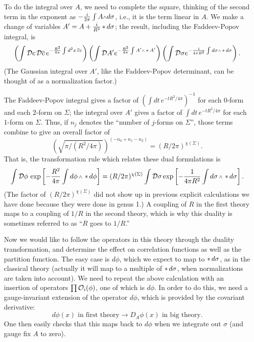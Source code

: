 To do the integral over $A$, we need to complete the square, thinking of
the second
term in the exponent as
$-\frac{i}{2\pi}\int A\wdg d\sigma$,
i.e., it is the term linear in $A$.  We make a change of variables
$A'=A+\frac{i}{R^2}\mathop{*} d\sigma$;
the result, including the Faddeev-Popov integral, is
\begin{equation}
\left(
\int\cD c\,\cD\overline{c}\,e^{-\frac{R^2}{4\pi}\int d^2x\,
\overline{c}c }\right)
\left(
\int \cD A' e^{-\frac{R^2}{4\pi}\int A'\wdg\hstar A'}\right)
\left(
\int \cD \sigma e^{-\frac1{4\pi R^2}\int
d\sigma\wdg\hstar d\sigma}\right).
\end{equation}
(The Gaussian integral over $A'$, like the Faddeev-Popov determinant, can
be thought of as a
normalization factor.)

The Faddeev-Popov integral gives a factor of $(\int dt\,e^{-tR^2/4\pi})^{-1}$
for
each $0$-form and
each $2$-form on $\Sigma$; the integral over $A'$ gives a factor of $\int
dt\,e^{-tR^2/4\pi}$
for each $1$-form on $\Sigma$.  Thus, if $n_j$ denotes the ``number of
$j$-forms
on $\Sigma$'', those terms combine to give an overall factor of
\begin{equation}
(\sqrt{\pi/(R^2/4\pi)})^{(-n_0+n_1-n_2)} = (R/2\pi)^{\chi(\Sigma)}.
\end{equation}
That is, the transformation rule which relates these dual formulations is
\begin{equation}
\int \cD\phi\,\exp\left[-\frac{R^2}{4\pi}\int d\phi\wdg\hstar d\phi\right]
= (R/2\pi)^{\chi(\Sigma)}
\int \cD\sigma \exp\left[-\frac1{4\pi R^2}\int d\sigma\wdg\hstar
d\sigma\right].
\end{equation}
(The factor of $(R/2\pi)^{\chi(\Sigma)}$ did not show up in previous explicit
calculations
we have done because they were done in genus 1.)  A coupling of $R$ in the
first
theory maps to a coupling of $1/R$ in the second theory, which is why this
duality
is sometimes referred to as ``$R$ goes to $1/R$.''

Now we would like to follow the operators in this theory through the duality
transformation, and determine the effect on correlation functions as well as
the
partition function.  The easy case is $d\phi$, which we expect to map to
$\mathop{*} d\sigma$, as in the classical theory (actually it will map to a
multiple
of $\mathop{*} d\sigma$, when normalizations are taken into account).
We need to repeat the above calculation with an insertion of operators
$\prod {\cal O}_i(\phi)$, one of which is $d\phi$.  In order to do this, we need
a gauge-invariant extension of the operator $d\phi$, which is provided by
the covariant derivative:
\begin{equation}
d\phi(x) \text{ in first theory} \longrightarrow D_A\phi(x) \text{ in big
theory}.
\end{equation}
One then easily checks that this maps back to $d\phi$ when we integrate out
$\sigma$ (and gauge fix $A$ to zero).

